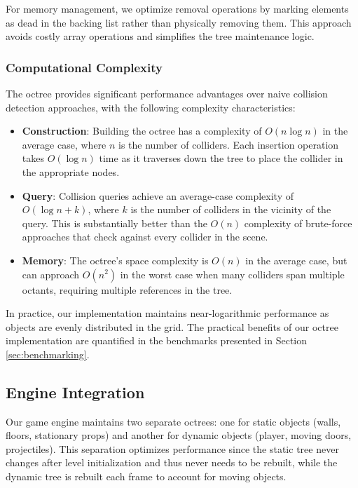 \documentclass{article}
\begin{document}
For memory management, we optimize removal operations by marking elements as
dead in the backing list rather than physically removing them. This approach
avoids costly array operations and simplifies the tree maintenance logic.

\subsubsection{Computational Complexity}
The octree provides significant performance advantages over naive collision detection approaches, with the following complexity characteristics:

\begin{itemize}
    \item \textbf{Construction}: Building the octree has a complexity of $O(n \log n)$ in the average case, where $n$ is the number of colliders. Each insertion operation takes $O(\log n)$ time as it traverses down the tree to place the collider in the appropriate nodes.

    \item \textbf{Query}: Collision queries achieve an average-case complexity of $O(\log n + k)$, where $k$ is the number of colliders in the vicinity of the query. This is substantially better than the $O(n)$ complexity of brute-force approaches that check against every collider in the scene.

    \item \textbf{Memory}: The octree's space complexity is $O(n)$ in the average case, but can approach $O(n^2)$ in the worst case when many colliders span multiple octants, requiring multiple references in the tree.
\end{itemize}

In practice, our implementation maintains near-logarithmic performance as
objects are evenly distributed in the grid. The practical benefits of our
octree implementation are quantified in the benchmarks presented in Section
\ref{sec:benchmarking}.

\subsection{Engine Integration}
Our game engine maintains two separate octrees: one for static objects (walls,
floors, stationary props) and another for dynamic objects (player, moving
doors, projectiles). This separation optimizes performance since the static
tree never changes after level initialization and thus never needs to be
rebuilt, while the dynamic tree is rebuilt each frame to account for moving
objects.
\end{document}
